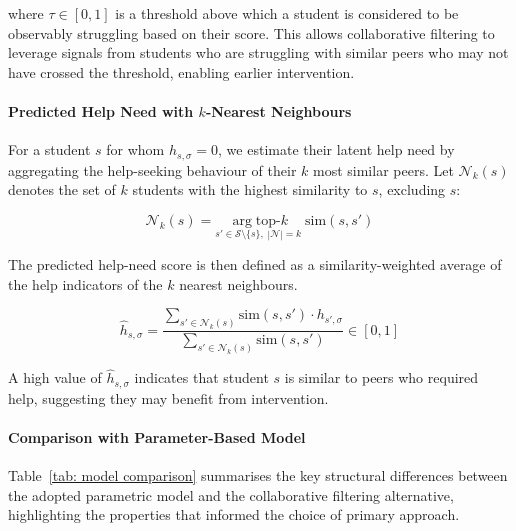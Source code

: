 where $\tau \in [0,1]$ is a threshold above which a student is considered to be observably struggling based on their score. This allows collaborative filtering to leverage signals from students who are struggling with similar peers who may not have crossed the threshold, enabling earlier intervention.

\paragraph{Predicted Help Need with $k$-Nearest Neighbours}
For a student $s$ for whom $h_{s,\sigma} = 0$, we estimate their latent help need by aggregating the help-seeking behaviour of their $k$ most similar peers.
Let $\mathcal{N}_k(s)$ denotes the set of $k$ students with the highest similarity to $s$, excluding $s$:

\begin{equation}
    \mathcal{N}_k(s) = \underset{
        s' \in \mathcal{S} \setminus \{s\},\; |\mathcal{N}| = k
    }{\arg\text{top-}k}\; \text{sim}(s, s')
\end{equation}

The predicted help-need score is then defined as a similarity-weighted average of the help indicators of the $k$ nearest neighbours.


\begin{equation}
    \hat{h}_{s,\sigma} =
    \frac{\displaystyle\sum_{s' \in \mathcal{N}_k(s)} \text{sim}(s, s') \cdot h_{s',\sigma}}
         {\displaystyle\sum_{s' \in \mathcal{N}_k(s)} \text{sim}(s, s')}
    \in [0, 1]
\end{equation}

A high value of $\hat{h}_{s,\sigma}$ indicates that student $s$ is similar to peers who required help, suggesting they may benefit from intervention.

\paragraph{Comparison with Parameter-Based Model}
Table~\ref{tab: model comparison} summarises the key structural differences 
between the adopted parametric model and the collaborative filtering 
alternative, highlighting the properties that informed the choice of 
primary approach.

